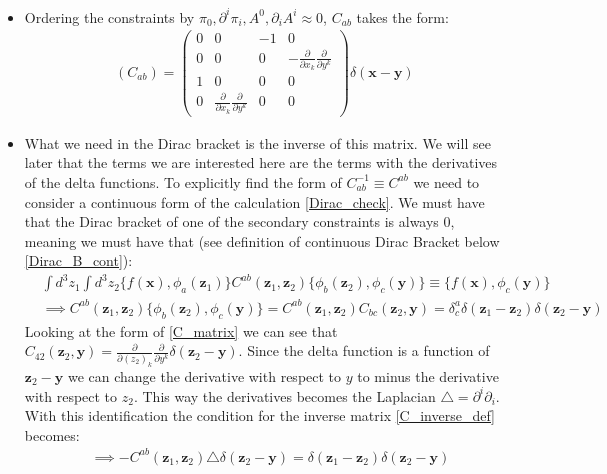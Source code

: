 \documentclass[11pt]{article}
\numberwithin{equation}{section}
\begin{document}
\begin{itemize}
  \item Ordering the constraints by $\pi_0,\partial^i\pi_i,A^0, \partial_iA^i \approx 0$, $C_{ab}$ takes the form:
  \begin{align}
  \label{C_matrix}
    (C_{ab}) = \begin{pmatrix}
      0 & 0& -1 & 0 \\
      0 & 0 & 0 & -\frac{\partial}{\partial x_k}\frac{\partial}{\partial y^k} \\
      1 & 0 & 0 & 0 \\ 
      0 & \frac{\partial}{\partial x_k}\frac{\partial}{\partial y^k} & 0 & 0 
    \end{pmatrix} \delta(\textbf{x}-\textbf{y})
  \end{align}
  \item What we need in the Dirac bracket is the inverse of this matrix. We will see later that the terms we are interested here are the terms with the derivatives of the delta functions. To explicitly find the form of $C_{ab}^{-1} \equiv C^{ab}$ we need to consider a continuous form of the calculation \ref{Dirac_check}. We must have that the Dirac bracket of one of the secondary constraints is always $0$, meaning we must have that (see definition of continuous Dirac Bracket below \ref{Dirac_B_cont}):
   \begin{align}
   \label{C_inverse_def}
       & \int d^3z_1\int d^3z_2\{f(\textbf{x}),\phi_a(\textbf{z}_1)\}C^{ab}\left(\textbf{z}_1,\textbf{z}_2\right)\{\phi_b(\textbf{z}_2),\phi_c(\textbf{y})\} \equiv \{f(\textbf{x}),\phi_c(\textbf{y})\} \nonumber\\
       & \implies C^{ab}\left(\textbf{z}_1,\textbf{z}_2\right)\{\phi_b(\textbf{z}_2),\phi_c(\textbf{y})\} =C^{ab}\left(\textbf{z}_1,\textbf{z}_2\right)C_{bc}\left(\textbf{z}_2,\textbf{y}\right) = \delta^a_c\delta\left(\textbf{z}_1-\textbf{z}_2\right)\delta(\textbf{z}_2-\textbf{y})
     \end{align}  
     Looking at the form of \ref{C_matrix} we can see that $C_{42}\left(\textbf{z}_2,\textbf{y}\right) = \frac{\partial}{\partial (z_{2})_k}\frac{\partial}{\partial y^k}\delta(\textbf{z}_2-\textbf{y})$. Since the delta function is a function of $\textbf{z}_2-\textbf{y}$ we can change the derivative with respect to $y$ to minus the derivative with respect to $z_2$. This way the derivatives becomes the Laplacian $\triangle=\partial^i\partial_i$. With this identification the condition for the inverse matrix \ref{C_inverse_def} becomes:
     \begin{align*}
         & \implies -C^{ab}\left(\textbf{z}_1,\textbf{z}_2\right)\triangle\delta(\textbf{z}_2-\textbf{y}) = \delta\left(\textbf{z}_1-\textbf{z}_2\right)\delta(\textbf{z}_2-\textbf{y})

\end{align*}
\end{itemize}
\end{document}
